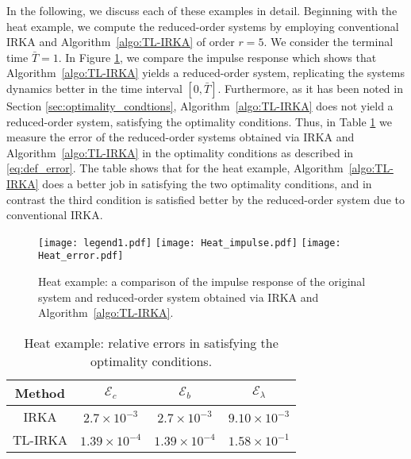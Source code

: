 \documentclass[a4paper,11pt, twoside]{article}
\makeatletter
\newcommand{\cE}{\ensuremath{\mathcal{E}}}
\newcommand{\includetikz}[1]{%
	\tikzsetnextfilename{figure/#1}%
}
\newenvironment{customlegend}[1][]{%
	\begingroup
	\csname pgfplots@init@cleared@structures\endcsname
	\pgfplotsset{#1}%
}{%
	\csname pgfplots@createlegend\endcsname
	\endgroup
}%
\def\addlegendimage{\csname pgfplots@addlegendimage\endcsname}
\newlength\fheight
\newlength\fwidth
\makeatother
\begin{document}
In the following, we discuss each of these examples in detail. Beginning with the heat example, we compute the reduced-order systems by employing 
conventional IRKA and Algorithm~\ref{algo:TL-IRKA} of order $r = 5$. We consider the terminal time $\bar T = 1$. In Figure \ref{fig:heat_impulse}, 
we compare the impulse response which shows that Algorithm~\ref{algo:TL-IRKA} yields a reduced-order system, replicating the systems dynamics better 
in the time interval $[0,\bar T]$. Furthermore, as it has been noted in Section \ref{sec:optimality_condtions}, Algorithm~\ref{algo:TL-IRKA} does not 
yield a reduced-order system, satisfying the optimality conditions. Thus, in Table \ref{tab:heat_opt} we measure the error of the 
reduced-order systems obtained via IRKA and Algorithm~\ref{algo:TL-IRKA} in the optimality conditions as described in \eqref{eq:def_error}. The table 
shows that for the heat example, Algorithm~\ref{algo:TL-IRKA} does a better job in satisfying the two optimality conditions, and in contrast the 
third condition is satisfied better by the reduced-order system due to conventional IRKA.
\begin{figure}[!htb]
	\centering
	\texttt{[image: legend1.pdf]}
	\centering
	\setlength\fheight{3cm}  \setlength\fwidth{5.25cm}
	\texttt{[image: Heat\_impulse.pdf]}  \texttt{[image: Heat\_error.pdf]}
	\caption{Heat example: a comparison of the impulse response of the original system and reduced-order system obtained via IRKA and 
Algorithm~\ref{algo:TL-IRKA}.}
	\label{fig:heat_impulse}
\end{figure}

	\begin{table}[!tb]
		\centering
		\begin{tabular}{|c|c|c|c|}
			\hline
			Method & $\cE_c$ & $\cE_b$ & $\cE_\lambda$\\ 
			\hline
IRKA & $2.7\times 10^{-3}$ & $2.7\times 10^{-3}$ & $9.10 \times 10^{-3}$\\ 
\hline
TL-IRKA &  $1.39\times 10^{-4}$ & $1.39\times 10^{-4}$ & $1.58\times 10^{-1}$\\
\hline
		\end{tabular}
		\caption{Heat example: relative errors in satisfying the optimality conditions.}
		\label{tab:heat_opt}
	\end{table}
\end{document}
